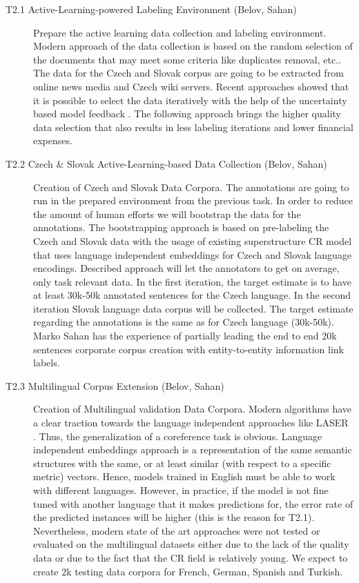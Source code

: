 \begin{description}
	\item [T2.1 Active-Learning-powered Labeling Environment (Belov, Sahan)] Prepare the active learning data collection and labeling environment.
Modern approach of the data collection is based on the random selection of the documents that may meet some criteria like duplicates removal, etc.. The data for the Czech and Slovak corpus are going to be extracted from online news media and Czech wiki servers. Recent approaches showed that it is possible to select the data iteratively with the help of the uncertainty based model feedback \cite{gal2017deep, lowell2018practical}. The following approach brings the higher quality data selection that also results in less labeling iterations and lower financial expenses.

	\item [T2.2 Czech \& Slovak Active-Learning-based Data Collection (Belov, Sahan)] Creation of Czech and Slovak Data Corpora. The annotations are going to run in the prepared environment from the previous task. In order to reduce the amount of human efforts we will bootstrap the data for the annotations. The bootstrapping approach is based on pre-labeling the Czech and Slovak data with the usage of existing superstructure CR model that uses language independent embeddings for Czech and Slovak language encodings. Described approach will let the annotators to get on average, only task relevant data.
In the first iteration, the target estimate is to have at least 30k-50k annotated sentences for the Czech language. In the second iteration Slovak language data corpus will be collected. The target estimate regarding the annotations is the same as for Czech language (30k-50k). Marko Sahan has the experience of partially leading the end to end 20k sentences corporate corpus creation with entity-to-entity information link labels.  

	\item [T2.3 Multilingual Corpus Extension (Belov, Sahan)] Creation of Multilingual validation Data Corpora. 
Modern algorithms have a clear traction towards the language independent approaches like LASER \cite{artetxe2019massively}. Thus, the generalization of a coreference task is obvious. Language independent embeddings approach is a representation of the same semantic structures with the same, or at least similar (with respect to a specific metric) vectors. Hence, models trained in English must be able to work with different languages. However, in practice, if the model is not fine tuned with another language that it makes predictions for, the error rate of the predicted instances will be higher (this is the reason for T2.1). Nevertheless, modern state of the art approaches were not tested or evaluated on the multilingual datasets either due to the lack of the quality data or due to the fact that the CR field is relatively young. We expect to create 2k testing data corpora for French, German, Spanish and Turkish. 

\end{description}


